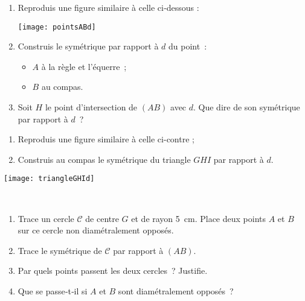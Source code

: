 \begin{exercice}
\begin{enumerate}
 \item Reproduis une figure similaire à celle ci‑dessous :
 \begin{center} \texttt{[image: pointsABd]} \end{center}
 \item Construis le symétrique par rapport à $d$ du point :
 \begin{itemize}
  \item $A$ à la règle et l'équerre ;
  \item $B$ au compas.
  \end{itemize}   
 \item Soit $H$ le point d'intersection de $(AB)$ avec $d$. Que dire de son symétrique par rapport à $d$ ?
 \end{enumerate} 
\end{exercice}


\begin{exercice}
\begin{minipage}[c]{0.52\linewidth}
\begin{enumerate}
 \item Reproduis une figure similaire à celle ci-contre ;
 \item Construis au compas le symétrique du triangle $GHI$ par rapport à $d$.
 \end{enumerate}
 \end{minipage} \hfill%
 \begin{minipage}[c]{0.44\linewidth}
  \texttt{[image: triangleGHId]}
   \end{minipage} \\
\end{exercice}


\begin{exercice}
\begin{enumerate}
 \item Trace un cercle $\mathcal{C}$ de centre $G$ et de rayon 5 cm. Place deux points $A$ et $B$ sur ce cercle non diamétralement opposés.
 \item Trace le symétrique de $\mathcal{C}$ par rapport à $(AB)$.
 \item Par quels points passent les deux cercles ? Justifie.
 \item Que se passe‑t‑il si $A$ et $B$ sont diamétralement opposés ?
 \end{enumerate}
\end{exercice}


